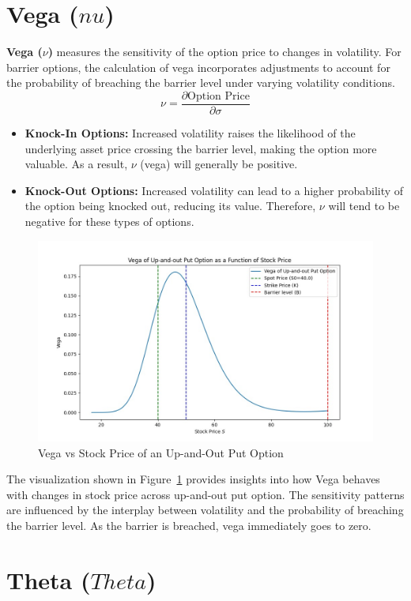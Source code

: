 \section{Vega ($nu$)}

\textbf{Vega (\(\nu\))} measures the sensitivity of the option price to changes in volatility. For barrier options, the calculation of vega incorporates adjustments to account for the probability of breaching the barrier level under varying volatility conditions.
\[
\nu = \frac{\partial \text{Option Price}}{\partial \sigma}
\]

\begin{itemize}
	\item \textbf{Knock-In Options:} Increased volatility raises the likelihood of the underlying asset price crossing the barrier level, making the option more valuable. As a result, \(\nu\) (vega) will generally be positive.
	\item \textbf{Knock-Out Options:} Increased volatility can lead to a higher probability of the option being knocked out, reducing its value. Therefore, \(\nu\) will tend to be negative for these types of options.
\end{itemize}

\begin{figure}[H]
    \centering
    \includegraphics[width=.65\linewidth]{content/images/vega_upout.png}
    \caption{Vega vs Stock Price of an Up-and-Out Put Option}
    \label{fig:vega_behavior}
\end{figure}

The visualization shown in Figure~\ref{fig:vega_behavior} provides insights into how Vega behaves with changes in stock price across up-and-out put option. The sensitivity patterns are influenced by the interplay between volatility and the probability of breaching the barrier level. As the barrier is breached, vega immediately goes to zero.

\section{Theta ($Theta$)}

